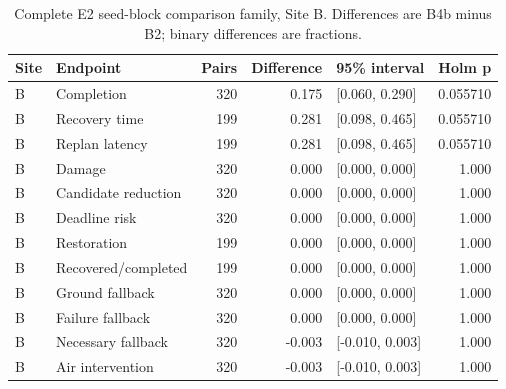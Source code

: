 \begin{table}[H]\centering\footnotesize
\caption{Complete E2 seed-block comparison family, Site B. Differences are B4b minus B2; binary differences are fractions.}\label{tab:e2_B}
\begin{tabularx}{\textwidth}{@{}lYrrYr@{}}\toprule
Site & Endpoint & Pairs & Difference & 95\% interval & Holm p \\\midrule
B & Completion & 320 & 0.175 & [0.060, 0.290] & 0.055710 \\
B & Recovery time & 199 & 0.281 & [0.098, 0.465] & 0.055710 \\
B & Replan latency & 199 & 0.281 & [0.098, 0.465] & 0.055710 \\
B & Damage & 320 & 0.000 & [0.000, 0.000] & 1.000 \\
B & Candidate reduction & 320 & 0.000 & [0.000, 0.000] & 1.000 \\
B & Deadline risk & 320 & 0.000 & [0.000, 0.000] & 1.000 \\
B & Restoration & 199 & 0.000 & [0.000, 0.000] & 1.000 \\
B & Recovered/completed & 199 & 0.000 & [0.000, 0.000] & 1.000 \\
B & Ground fallback & 320 & 0.000 & [0.000, 0.000] & 1.000 \\
B & Failure fallback & 320 & 0.000 & [0.000, 0.000] & 1.000 \\
B & Necessary fallback & 320 & -0.003 & [-0.010, 0.003] & 1.000 \\
B & Air intervention & 320 & -0.003 & [-0.010, 0.003] & 1.000 \\
\bottomrule\end{tabularx}\end{table}
